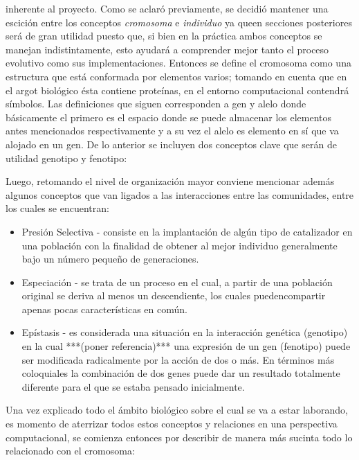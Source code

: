 \documentclass[class=report, crop=false]{standalone}
\begin{document}
inherente al proyecto.\break
Como se aclaró previamente, se decidió mantener una escición
entre los conceptos \textit{cromosoma} e \textit{individuo} 
ya queen secciones posteriores será de gran utilidad puesto que, 
si bien en la práctica ambos conceptos se manejan indistintamente, 
esto ayudará a comprender mejor tanto el proceso evolutivo como 
sus implementaciones.\medskip\break
Entonces se define el cromosoma como una estructura que está 
conformada por elementos varios; tomando en cuenta que en el 
argot biológico ésta contiene proteínas, en el entorno computacional 
contendrá símbolos. Las definiciones que siguen corresponden 
a gen y alelo donde básicamente el primero es el espacio donde 
se puede almacenar los elementos antes mencionados respectivamente 
y a su vez el alelo es elemento en sí que va alojado en un gen.\medskip\break  
De lo anterior se incluyen dos conceptos clave que serán de utilidad 
genotipo y fenotipo:


Luego, retomando el nivel de organización mayor conviene 
mencionar además algunos conceptos que van ligados a las 
interacciones entre las comunidades, entre los cuales se encuentran:

\begin{itemize}
\item Presión Selectiva - consiste en la implantación de algún 
tipo de catalizador en una población con la finalidad de obtener al 
mejor individuo generalmente bajo un número pequeño de generaciones. 
\item Especiación - se trata de un proceso en el cual, a partir de 
una población original se deriva al menos un descendiente, los cuales 
puedencompartir apenas pocas características en común. 
\item Epístasis - es considerada una situación en la interacción 
genética (genotipo) en la cual ***(poner referencia)*** una expresión 
de un gen (fenotipo) puede ser modificada radicalmente por la acción 
de dos o más. En términos más coloquiales la combinación de dos genes 
puede dar un resultado totalmente diferente para el que se estaba 
pensado inicialmente. 
\end{itemize}

Una vez explicado todo el ámbito biológico sobre el cual se va a 
estar laborando, es momento de aterrizar todos estos conceptos 
y relaciones en una perspectiva computacional, se comienza entonces 
por describir de manera más sucinta todo lo relacionado con el 
cromosoma:

\end{document}
